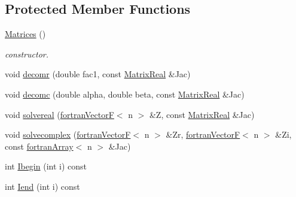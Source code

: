 \subsection*{Protected Member Functions}
\begin{DoxyCompactItemize}
\item 
\hyperlink{classodes_1_1Matrices_3_01false_00_01true_00_01n_00_01nsub_00_01nsup_01_4_aceb158d0871ec7d9a8a739dfb202545b}{Matrices} ()
\begin{DoxyCompactList}\small\item\em constructor. \end{DoxyCompactList}\item 
void \hyperlink{classodes_1_1Matrices_3_01false_00_01true_00_01n_00_01nsub_00_01nsup_01_4_a5570c10a9d52c573ef39c23a315a93e2}{decomr} (double fac1, const \hyperlink{classodes_1_1Matrices_3_01false_00_01true_00_01n_00_01nsub_00_01nsup_01_4_a63af1e92e4c06d6986909d7af6a9c0b9}{Matrix\+Real} \&Jac)
\item 
void \hyperlink{classodes_1_1Matrices_3_01false_00_01true_00_01n_00_01nsub_00_01nsup_01_4_a15d008b4bfcf95664aaa7ae4e9407a97}{decomc} (double alpha, double beta, const \hyperlink{classodes_1_1Matrices_3_01false_00_01true_00_01n_00_01nsub_00_01nsup_01_4_a63af1e92e4c06d6986909d7af6a9c0b9}{Matrix\+Real} \&Jac)
\item 
void \hyperlink{classodes_1_1Matrices_3_01false_00_01true_00_01n_00_01nsub_00_01nsup_01_4_afc5be522ad79bd8355612626428ff493}{solvereal} (\hyperlink{classodes_1_1fortranVectorF}{fortran\+Vector\+F}$<$ n $>$ \&Z, const \hyperlink{classodes_1_1Matrices_3_01false_00_01true_00_01n_00_01nsub_00_01nsup_01_4_a63af1e92e4c06d6986909d7af6a9c0b9}{Matrix\+Real} \&Jac)
\item 
void \hyperlink{classodes_1_1Matrices_3_01false_00_01true_00_01n_00_01nsub_00_01nsup_01_4_a445a775dd02c735734a64f82426de56d}{solvecomplex} (\hyperlink{classodes_1_1fortranVectorF}{fortran\+Vector\+F}$<$ n $>$ \&Zr, \hyperlink{classodes_1_1fortranVectorF}{fortran\+Vector\+F}$<$ n $>$ \&Zi, const \hyperlink{classodes_1_1fortranArray}{fortran\+Array}$<$ n $>$ \&Jac)
\item 
int \hyperlink{classodes_1_1Matrices_3_01false_00_01true_00_01n_00_01nsub_00_01nsup_01_4_a644087ff1a72cf68a018b0a8dd8de5bd}{Ibegin} (int i) const 
\item 
int \hyperlink{classodes_1_1Matrices_3_01false_00_01true_00_01n_00_01nsub_00_01nsup_01_4_a2e74712e03d6d2c13305aca0d9dd4c21}{Iend} (int i) const 
\end{DoxyCompactItemize}
